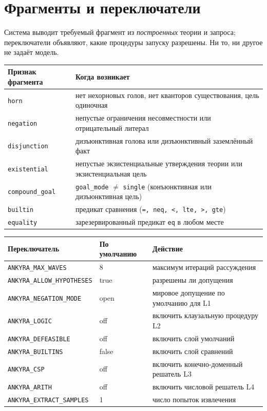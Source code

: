 \documentclass[11pt,a4paper]{article}
\begin{document}
\appendix

\section{Фрагменты и переключатели}
\label{app:fragments}

Система выводит требуемый фрагмент из \emph{построенных} теории и запроса; переключатели объявляют, какие процедуры запуску разрешены. Ни то, ни другое не задаёт модель.

\begin{center}
\begin{tabular}{lp{9.6cm}}
\toprule
\textbf{Признак фрагмента} & \textbf{Когда возникает} \\
\midrule
\texttt{horn} & нет нехорновых голов, нет кванторов существования, цель одиночная \\
\texttt{negation} & непустые ограничения несовместности или отрицательный литерал \\
\texttt{disjunction} & дизъюнктивная голова или дизъюнктивный заземлённый факт \\
\texttt{existential} & непустые экзистенциальные утверждения теории или экзистенциальная цель \\
\texttt{compound\_goal} & \texttt{goal\_mode} $\neq$ \texttt{single} (конъюнктивная или дизъюнктивная цель) \\
\texttt{builtin} & предикат сравнения (\texttt{=, neq, <, lte, >, gte}) \\
\texttt{equality} & зарезервированный предикат \texttt{eq} в любом месте \\
\bottomrule
\end{tabular}
\end{center}

\begin{center}
\begin{tabular}{lll}
\toprule
\textbf{Переключатель} & \textbf{По умолчанию} & \textbf{Действие} \\
\midrule
\texttt{ANKYRA\_MAX\_WAVES} & 8 & максимум итераций рассуждения \\
\texttt{ANKYRA\_ALLOW\_HYPOTHESES} & true & разрешены ли допущения \\
\texttt{ANKYRA\_NEGATION\_MODE} & open & мировое допущение по умолчанию для L1 \\
\texttt{ANKYRA\_LOGIC} & off & включить клаузальную процедуру L2 \\
\texttt{ANKYRA\_DEFEASIBLE} & off & включить слой умолчаний \\
\texttt{ANKYRA\_BUILTINS} & false & включить слой сравнений \\
\texttt{ANKYRA\_CSP} & off & включить конечно-доменный решатель L3 \\
\texttt{ANKYRA\_ARITH} & off & включить числовой решатель L4 \\
\texttt{ANKYRA\_EXTRACT\_SAMPLES} & 1 & число попыток извлечения \\
\bottomrule
\end{tabular}
\end{center}
\end{document}
